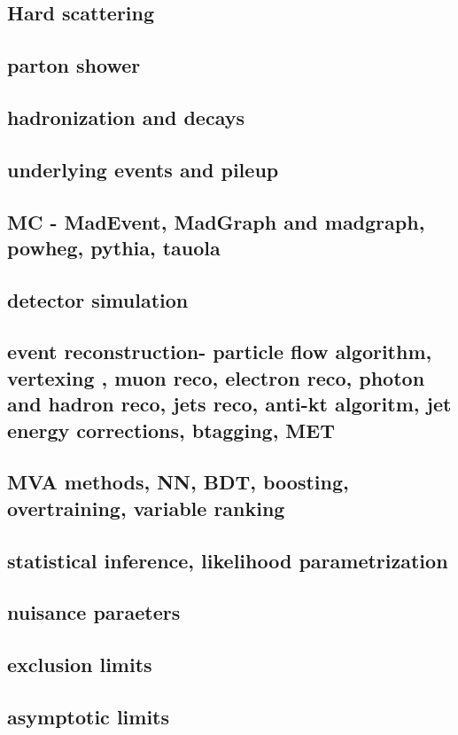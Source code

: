 \subsection{Hard scattering  }
\subsection{parton shower }
\subsection{hadronization and decays }
\subsection{underlying events and pileup }
\subsection{ MC - MadEvent, MadGraph and madgraph\@NLO, powheg, pythia, tauola}
\subsection{ detector simulation}
\subsection{event reconstruction- particle flow algorithm, vertexing , muon reco, electron reco, photon and hadron reco, jets reco, anti-kt algoritm, jet energy corrections, btagging, MET  }
\subsection{ MVA methods, NN, BDT, boosting, overtraining, variable ranking  }
\subsection{statistical inference, likelihood parametrization}
\subsection{ nuisance paraeters}
\subsection{exclusion limits }
\subsection{asymptotic limits }

